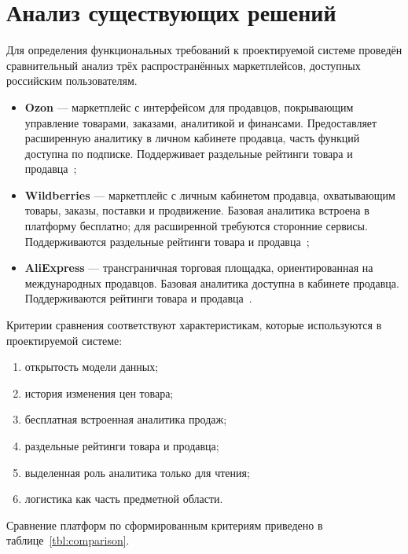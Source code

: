 
\section{Анализ существующих решений}

Для определения функциональных требований к проектируемой системе проведён сравнительный анализ трёх распространённых маркетплейсов, доступных российским пользователям.

\begin{itemize}
    \item \textbf{Ozon} --- маркетплейс с интерфейсом для продавцов, покрывающим управление товарами, заказами, аналитикой и финансами. Предоставляет расширенную аналитику в личном кабинете продавца, часть функций доступна по подписке. Поддерживает раздельные рейтинги товара и продавца~\cite{ozon};
    \item \textbf{Wildberries} --- маркетплейс с личным кабинетом продавца, охватывающим товары, заказы, поставки и продвижение. Базовая аналитика встроена в платформу бесплатно; для расширенной требуются сторонние сервисы. Поддерживаются раздельные рейтинги товара и продавца~\cite{wildberries};
    \item \textbf{AliExpress} --- трансграничная торговая площадка, ориентированная на международных продавцов. Базовая аналитика доступна в кабинете продавца. Поддерживаются рейтинги товара и продавца~\cite{aliexpress}.
\end{itemize}

Критерии сравнения соответствуют характеристикам, которые используются в проектируемой системе:

\begin{enumerate}
    \item открытость модели данных;
    \item история изменения цен товара;
    \item бесплатная встроенная аналитика продаж;
    \item раздельные рейтинги товара и продавца;
    \item выделенная роль аналитика только для чтения;
    \item логистика как часть предметной области.
\end{enumerate}

Сравнение платформ по сформированным критериям приведено в таблице~\ref{tbl:comparison}.


